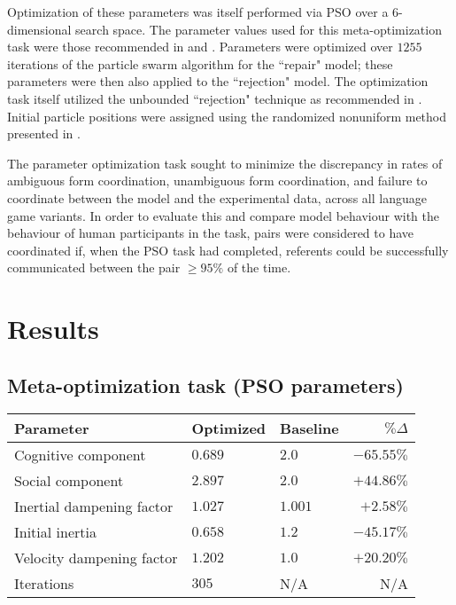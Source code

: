 \documentclass[12pt,a4paper]{article}
\begin{document}
Optimization of these parameters was itself performed via PSO over a $6$-dimensional search space. The parameter values used for this meta-optimization task were those recommended in \cite{shi1998} and \cite{solnon2010}. Parameters were optimized over $1255$ iterations of the particle swarm algorithm for the ``repair" model; these parameters were then also applied to the ``rejection" model. The optimization task itself utilized the unbounded ``rejection" technique as recommended in \cite{engelbrecht2005}. Initial particle positions were assigned using the randomized nonuniform method presented in \cite{mitchell1991}.

The parameter optimization task sought to minimize the discrepancy in rates of ambiguous form coordination, unambiguous form coordination, and failure to coordinate between the model and the experimental data, across all language game variants. In order to evaluate this and compare model behaviour with the behaviour of human participants in the task, pairs were considered to have coordinated if, when the PSO task had completed, referents could be successfully communicated between the pair $\geq 95\%$ of the time.
\clearpage


\section{Results}
\subsection{Meta-optimization task (PSO parameters)}
\label{sec:parameter_optimization}
\begin{center}
    \begin{tabular}{ l l l r }
    Parameter & Optimized & Baseline & $\% \Delta$ \\ \hline
    Cognitive component       & $0.689$ & $2.0$   & $-65.55\%$ \\ \hline
    Social component          & $2.897$ & $2.0$   & $+44.86\%$ \\ \hline
    Inertial dampening factor & $1.027$ & $1.001$ & $+2.58\%$\\ \hline
    Initial inertia           & $0.658$ & $1.2$   & $-45.17\%$ \\ \hline
    Velocity dampening factor & $1.202$ & $1.0$     & $+20.20\%$\\ \hline
    Iterations                & $305$   & N/A     & N/A\\ 
    \end{tabular}
	\label{table:1}
\end{center}
\end{document}
